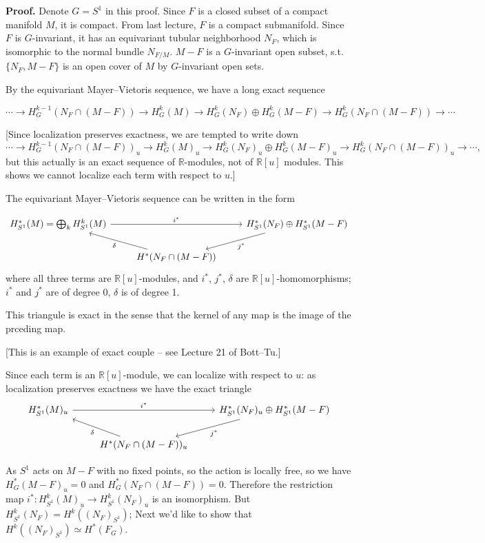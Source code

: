 \documentclass{article}
\theoremstyle{mystyle}
\theoremstyle{remark}
\numberwithin{equation}{section}
\begin{document}
\noindent \textbf{Proof.} Denote $G = S^1$ in this proof. Since $F$ is a closed subset of a compact manifold $M$, it is compact. From last lecture, $F$ is a compact submanifold. Since $F$ is $G$-invariant, it has an equivariant tubular neighborhood $N_F$, which is isomorphic to the normal bundle $N_{F/M}$. $M-F$ is a $G$-invariant open subset, s.t. $\{N_F,M-F\}$ is an open cover of $M$ by $G$-invariant open sets.

By the equivariant Mayer--Vietoris sequence, we have a long exact sequence

$$\cdots \rightarrow  H^{k-1}_G(N_F\cap (M-F))\rightarrow H^k_G(M)\rightarrow H^k_G(N_F)\oplus H^k_G(M-F)\rightarrow 
H^k_G(N_F\cap (M-F))\rightarrow \cdots$$

[Since localization preserves exactness, we are tempted to write down
$$\cdots \rightarrow  H^{k-1}_G(N_F\cap (M-F))_u\rightarrow H^k_G(M)_u\rightarrow H^k_G(N_F)_u\oplus H^k_G(M-F)_u\rightarrow 
H^k_G(N_F\cap (M-F))_u\rightarrow \cdots,$$
but this actually is an exact sequence of $\mathbb{R}$-modules, not of $\mathbb{R}[u]$ modules. This shows we cannot localize each term with respect to $u$.]

The equivariant Mayer--Vietoris sequence can be written in the form

$$\begin{tikzcd}
H^*_{S^1}(M)=\bigoplus_k H^k_{S^1}(M)
\ar[rr, "i^*"]
&&H^*_{S^1}(N_F)\oplus H^*_{S^1}(M-F) \ar[dl,"j^*"] \\ & H^*(N_F\cap (M-F)) \ar[ul, "\delta "] & 
\end{tikzcd}
$$
where all three terms are $\mathbb{R}[u]$-modules, and $i^*$, $j^*$, $\delta$ are $\mathbb{R}[u]$-homomorphisms; $i^*$ and $j^*$ are of degree 0, $\delta$ is of degree 1.

This triangule is exact in the sense that the kernel of any map is the image of the prceding map.

[This is an example of exact couple -- see Lecture 21 of Bott--Tu.]

Since each term is an $\mathbb{R}[u]$-module, we can localize with respect to $u$: as localization preserves exactness we have the exact triangle
$$\begin{tikzcd}
H^*_{S^1}(M)_u
\ar[rr, "i^*"]
&&H^*_{S^1}(N_F)_u\oplus H^*_{S^1}(M-F) \ar[dl,"j^*"] \\ & H^*(N_F\cap (M-F))_u \ar[ul, "\delta "] & 
\end{tikzcd}
$$


As $S^1$ acts on $M-F$ with no fixed points, so the action is locally free, so we have $H^*_G(M-F)_u=0$ and $H^*_G(N_F\cap(M-F))=0$. Therefore the restriction map $i^*\colon H^k_{S^1}(M)_u \rightarrow H^k_{S^1}(N_F)_u$ is an isomorphism. But $H^k_{S^1}(N_F) = H^k((N_F)_{S^1})$; Next we'd like to show that $H^k((N_F)_{S^1})\simeq H^*(F_G)$.
\end{document}
